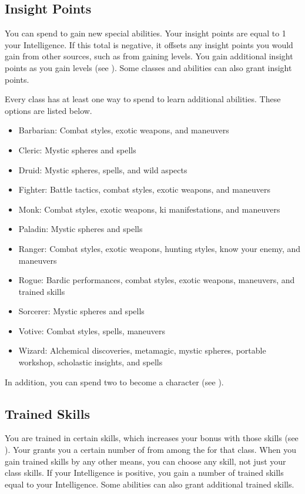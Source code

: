   \subsection{Insight Points}\label{Insight Points}
    You can spend  to gain new special abilities.
    Your insight points are equal to 1 \add your Intelligence.
    If this total is negative, it offsets any insight points you would gain from other sources, such as from gaining levels.
    You gain additional insight points as you gain levels (see ).
    Some classes and abilities can also grant insight points.

    Every class has at least one way to spend  to learn additional abilities.
    These options are listed below.
    \begin{itemize}
      \item Barbarian: Combat styles, exotic weapons, and maneuvers
      \item Cleric: Mystic spheres and spells
      \item Druid: Mystic spheres, spells, and wild aspects
      \item Fighter: Battle tactics, combat styles, exotic weapons, and maneuvers
      \item Monk: Combat styles, exotic weapons, ki manifestations, and maneuvers
      \item Paladin: Mystic spheres and spells
      \item Ranger: Combat styles, exotic weapons, hunting styles, know your enemy, and maneuvers
      \item Rogue: Bardic performances, combat styles, exotic weapons, maneuvers, and trained skills
      \item Sorcerer: Mystic spheres and spells
      \item Votive: Combat styles, spells, maneuvers
      \item Wizard: Alchemical discoveries, metamagic, mystic spheres, portable workshop, scholastic insights, and spells
    \end{itemize}

    In addition, you can spend two  to become a  character (see ).

  \subsection{Trained Skills}\label{Trained Skills}
    You are trained in certain skills, which increases your bonus with those skills (see ).
    Your  grants you a certain number of  from among the  for that class.
    When you gain trained skills by any other means, you can choose any skill, not just your class skills.
    If your Intelligence is positive, you gain a number of trained skills equal to your Intelligence.
    Some abilities can also grant additional trained skills.

